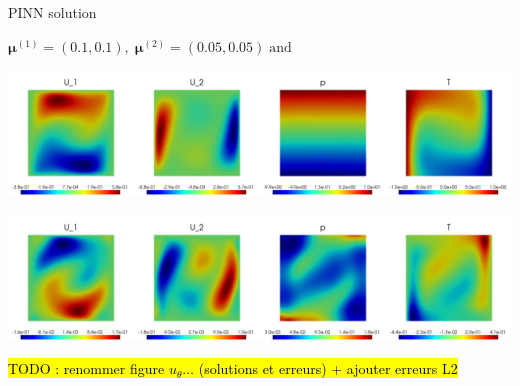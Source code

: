 \begin{frame}{PINN solution}
    \vspace{-5pt}
    \begin{center}
        $\bm{\mu}^{(1)} = (0.1,0.1), \; \bm{\mu}^{(2)} = (0.05,0.05) \; \text{and} \;$

        \includegraphics[width=\linewidth]{images/pinn/training/PINN_plot_case4_v5_param3.png}
        
        \includegraphics[width=\linewidth]{images/pinn/training/PINN_error_plot_case4_v5_param3.png}
    \end{center}

    \hl{TODO : renommer figure $u_\theta\dots$ (solutions et erreurs) + ajouter erreurs L2}

\end{frame}